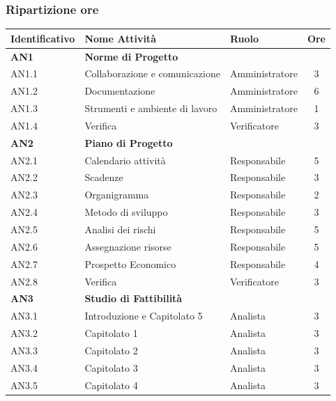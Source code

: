 \subsubsection{Ripartizione ore}
\bgroup
\begin{longtable}{|l|l|l|c|}
  \endfirsthead
  \hline
  \textbf{Identificativo} &
  \textbf{Nome Attività} &
  \textbf{Ruolo} &
  \textbf{Ore}\\
  \endhead
  \hline
  \textbf{AN1} & \textbf{Norme di Progetto} &  &  \\
  \hline
  	{AN1.1} & {Collaborazione e comunicazione} & Amministratore  & 3\\
  	\hline
  	{AN1.2} & {Documentazione} & Amministratore & 6\\
  	\hline
  	{AN1.3} & {Strumenti e ambiente di lavoro} & Amministratore &  1\\
  	\hline
  	{AN1.4} & {Verifica} & Verificatore & 3 \\
  \hline
  \textbf{AN2} & \textbf{Piano di Progetto}  & & \\
    \hline
    	{AN2.1} & {Calendario attività} & Responsabile &  5\\
    	\hline
    	{AN2.2} & {Scadenze} & Responsabile & 3 \\
    	\hline
    	{AN2.3} & {Organigramma} & Responsabile & 2 \\
    	\hline
    	{AN2.4} & {Metodo di sviluppo} & Responsabile &   3\\
    	\hline
    	{AN2.5} & {Analisi dei rischi} & Responsabile  &  5\\
    	\hline
    	{AN2.6} & {Assegnazione risorse} & Responsabile  &  5\\
    	\hline
    	{AN2.7} & {Prospetto Economico} & Responsabile  &  4\\
    	\hline
    	{AN2.8} & {Verifica} & Verificatore & 3 \\
    \hline
    \textbf{AN3} & \textbf{Studio di Fattibilità}  & &  \\
      \hline
      	{AN3.1} & {Introduzione e Capitolato 5} & Analista  & 3 \\
      	\hline
      	{AN3.2} & {Capitolato 1} & Analista & 3\\
      	\hline
      	{AN3.3} & {Capitolato 2} & Analista  & 3 \\
      	\hline
      	{AN3.4} & {Capitolato 3} & Analista  & 3 \\
      	\hline
      	{AN3.5} & {Capitolato 4} & Analista  & 3 \\
      	\hline

\end{longtable}
